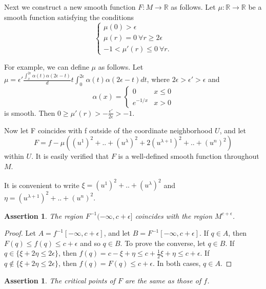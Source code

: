 \documentclass[a4paper,11pt,reqno]{amsart}
\newtheorem{asser}[thm]{Assertion}
\newcommand{\RR}{\mathbb{R}}      %
\begin{document}
Next we construct a new smooth function $F : M \to \RR$ as follows. Let $\mu
:\RR \to \RR$ be a smooth function satisfying the conditions
\begin{equation}
  \begin{cases}
    \mu(0) > \epsilon \\
    \mu(r) = 0 \: \forall r \ge 2\epsilon \\
    -1 < \mu'(r) \le 0 \: \forall r.
  \end{cases}
\end{equation}

For example, we can define $\mu$ as follows. Let $\mu = \epsilon'
\frac{\int_x^{2\epsilon} \alpha(t)\alpha(2\epsilon-t)}dt{\int_0^{2\epsilon}
  \alpha(t)\alpha(2\epsilon-t)}dt$, where $2\epsilon > \epsilon' > \epsilon$ and
\begin{equation}
  \alpha(x) =
  \begin{cases}
    0 & x \le 0 \\
    e^{-1/x} & x > 0
  \end{cases}
\end{equation}
is smooth. Then $0 \ge \mu'(r) > -\frac{\epsilon'}{2\epsilon} > -1$.

Now let F coincides with f outside of the coordinate neighborhood $U$, and let
\begin{equation}
  F = f -\mu((u^1)^2+..+(u^{\lambda})^2 + 2(u^{\lambda+1})^2+..+(u^{n})^2)
\end{equation}
within $U$. It is easily verified that $F$ is a well-defined smooth function
throughout $M$.

It is convenient to write $\xi = (u^1)^2+..+(u^{\lambda})^2$ and $\eta =
(u^{\lambda+1})^2+..+(u^{n})^2$.

\begin{asser}
  The region $F^{-1}(-\infty, c+\epsilon]$ coincides with the region $M^{c+\epsilon}$.
\end{asser}

\begin{proof}
  Let $A = f^{-1}[-\infty, c+\epsilon]$, and let $B = F^{-1}[-\infty,
  c+\epsilon]$. If $q \in A$, then $F(q) \le f(q) \le c+\epsilon$ and so $q \in
  B$. To prove the converse, let $q \in B$. If $q \in \{ \xi + 2\eta \le
  2\epsilon \}$, then $f(q) = c - \xi + \eta \le c+ \frac{1}{2}\xi + \eta \le
  c+\epsilon$. If $q \notin \{ \xi + 2\eta \le 2\epsilon \}$, then $f(q) =
  F(q) \le c+\epsilon$. In both cases, $q \in A$.
\end{proof}

\begin{asser}
  The critical points of $F$ are the same as those of $f$.
\end{asser}
\end{document}
